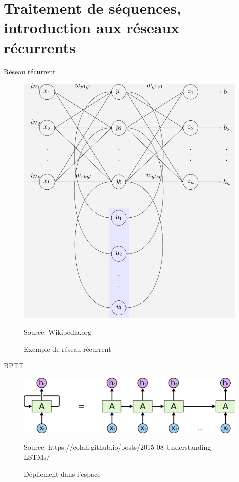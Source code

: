 \documentclass{beamer}
\begin{document}
\section{Traitement de séquences, introduction aux réseaux récurrents}

\begin{frame}{Réseau récurrent}
  \begin{figure}
  \begin{center}
  \includegraphics[scale=0.25]{images/reseau_recurrent.png}
  \caption{Exemple de réseau récurrent}
  {\tiny Source: Wikipedia.org}
  \end{center}
  \end{figure}
\end{frame}

\begin{frame}{BPTT}
  \begin{figure}
  \begin{center}
  \includegraphics[scale=0.16]{images/bptt.png}
  \caption{Dépliement dans l'espace}
  {\tiny Source: https://colah.github.io/posts/2015-08-Understanding-LSTMs/}
  \end{center}
  \end{figure}
\end{frame}
\end{document}
